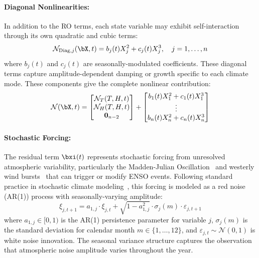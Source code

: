 \paragraph{Diagonal Nonlinearities:} In addition to the RO terms, each state variable may exhibit self-interaction through its own quadratic and cubic terms:
\begin{equation}
    \mathcal{N}_{\text{Diag},j}(\bX, t) = b_j(t) X_j^2 + c_j(t) X_j^3, \quad j = 1, \ldots, n
\end{equation}
where $b_j(t)$ and $c_j(t)$ are seasonally-modulated coefficients. These diagonal terms capture amplitude-dependent damping or growth specific to each climate mode. These components give the complete nonlinear contribution:
\begin{equation}
    \mathcal{N}(\bX, t) = \begin{bmatrix} \mathcal{N}_T(T, H, t) \\ \mathcal{N}_H(T, H, t) \\ \mathbf{0}_{n-2} \end{bmatrix} + \begin{bmatrix} b_1(t) X_1^2 + c_1(t) X_1^3 \\ \vdots \\ b_n(t) X_n^2 + c_n(t) X_n^3 \end{bmatrix}
\end{equation}

\paragraph{Stochastic Forcing:} The residual term $\bxi(t)$ represents stochastic forcing from unresolved atmospheric variability, particularly the Madden-Julian Oscillation~\cite{madden1971detection,zhang2005mjo} and westerly wind bursts~\cite{harrison1997westerly} that can trigger or modify ENSO events. Following standard practice in stochastic climate modeling~\cite{hasselmann1976stochastic,penland1993prediction}, this forcing is modeled as a red noise (AR(1)) process with seasonally-varying amplitude:
\begin{equation}
    \xi_{j,t+1} = a_{1,j} \cdot \xi_{j,t} + \sqrt{1 - a_{1,j}^2} \cdot \sigma_j(m) \cdot \varepsilon_{j,t+1}
    \label{eq:noise}
\end{equation}
where $a_{1,j} \in [0, 1)$ is the AR(1) persistence parameter for variable $j$, $\sigma_j(m)$ is the standard deviation for calendar month $m \in \{1, \ldots, 12\}$, and $\varepsilon_{j,t} \sim \mathcal{N}(0, 1)$ is white noise innovation. The seasonal variance structure captures the observation that atmospheric noise amplitude varies throughout the year.

